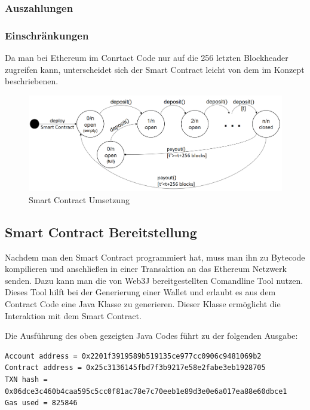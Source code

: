 \subsubsection{Auszahlungen}



\subsubsection{Einschränkungen}

Da man bei Ethereum im Conrtact Code nur auf die 256 letzten Blockheader zugreifen kann, unterscheidet sich der Smart Contract leicht von dem im Konzept beschriebenen.

\begin{figure}[H]
\centering
\includegraphics[width=1\linewidth]{Figures/umsetzung_eth/smart_contract_automat}
\decoRule
\caption{Smart Contract Umsetzung}
\label{fig:smart_contract_automat}
\end{figure}

\subsection{Smart Contract Bereitstellung}
Nachdem man den Smart Contract programmiert hat, muss man ihn zu Bytecode kompilieren und anschließen in einer Transaktion an das Ethereum Netzwerk senden. Dazu kann man die von Web3J bereitgestellten Comandline Tool nutzen. Dieses Tool hilft bei der Generierung einer Wallet und erlaubt es aus dem Contract Code eine Java Klasse zu generieren. Dieser Klasse ermöglicht die Interaktion mit dem Smart Contract. 


Die Ausführung des oben gezeigten Java Codes führt zu der folgenden Ausgabe:

\begin{lstlisting}
Account address = 0x2201f3919589b519135ce977cc0906c9481069b2
Contract address = 0x25c3136145fbd7f3b9217e58e2fabe3eb1928705
TXN hash = 0x06dce3c460b4caa595c5cc0f81ac78e7c70eeb1e89d3e0e6a017ea88e60dbce1
Gas used = 825846
\end{lstlisting}


